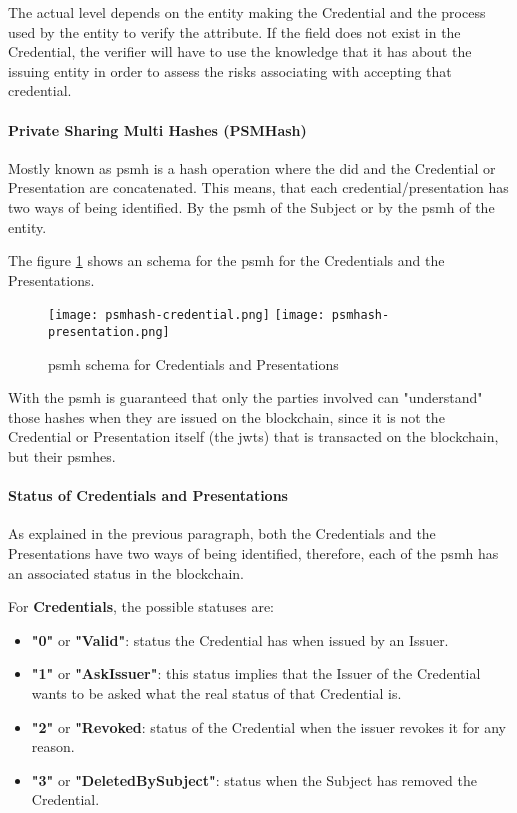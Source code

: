 The actual level depends on the entity making the Credential and the process used by the entity to verify the attribute. If the field does not exist in the Credential, the verifier will have to use the knowledge that it has about the issuing entity in order to assess the risks associating with accepting that credential.

\paragraph{Private Sharing Multi Hashes (PSMHash)}
Mostly known as \acrshort{psmh} is a hash operation where the \acrshort{did} and the Credential or Presentation are concatenated. This means, that each credential/presentation has two ways of being identified. By the \acrshort{psmh} of the Subject or by the \acrshort{psmh} of the entity.

The figure \ref{fig:psmh} shows an schema for the \acrshort{psmh} for the Credentials and the Presentations.
\begin{figure}[h]
    \centering
    \texttt{[image: psmhash-credential.png]}\hfill
    \texttt{[image: psmhash-presentation.png]}
    \caption{\acrshort{psmh} schema for Credentials and Presentations}
    \label{fig:psmh}
\end{figure}

With the \acrshort{psmh} is guaranteed that only the parties involved can "understand" those hashes when they are issued on the blockchain, since it is not the Credential or Presentation itself (the \acrshort{jwt}s) that is transacted on the blockchain, but their \acrshort{psmh}es.

\paragraph{Status of Credentials and Presentations}
As explained in the previous paragraph, both the Credentials and the Presentations have two ways of being identified, therefore, each of the \acrshort{psmh} has an associated status in the blockchain.

For \textbf{Credentials}, the possible statuses are:
\begin{itemize}
    \item \textbf{"0"} or \textbf{"Valid"}: status the Credential has when issued by an Issuer.
    \item \textbf{"1"} or \textbf{"AskIssuer"}: this status implies that the Issuer of the Credential wants to be asked what the real status of that Credential is.
    \item \textbf{"2"} or \textbf{"Revoked}: status of the Credential when the issuer revokes it for any reason.
    \item \textbf{"3"} or \textbf{"DeletedBySubject"}: status when the Subject has removed the Credential.
\end{itemize}

